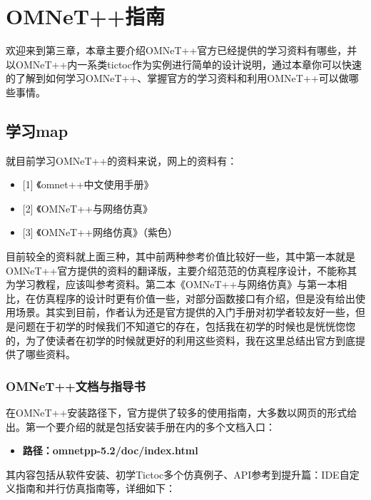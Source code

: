 \chapter{OMNeT++指南}
\label{omnet指南}

欢迎来到第三章，本章主要介绍OMNeT++官方已经提供的学习资料有哪些，并以OMNeT++内一系类tictoc作为实例进行简单的设计说明，通过本章你可以快速的了解到如何学习OMNeT++、掌握官方的学习资料和利用OMNeT++可以做哪些事情。

\section{学习map}
\label{学习map}

就目前学习OMNeT++的资料来说，网上的资料有：

\begin{itemize}
\item {[1]} 《omnet++中文使用手册》

\item {[2]} 《OMNeT++与网络仿真》

\item {[3]} 《OMNeT++网络仿真》（紫色） 

\end{itemize}

目前较全的资料就上面三种，其中前两种参考价值比较好一些，其中第一本就是OMNeT++官方提供的资料的翻译版，主要介绍范范的仿真程序设计，不能称其为学习教程，应该叫参考资料。第二本《OMNeT++与网络仿真》与第一本相比，在仿真程序的设计时更有价值一些，对部分函数接口有介绍，但是没有给出使用场景。其实到目前，作者认为还是官方提供的入门手册对初学者较友好一些，但是问题在于初学的时候我们不知道它的存在，包括我在初学的时候也是恍恍惚惚的，为了使读者在初学的时候就更好的利用这些资料，我在这里总结出官方到底提供了哪些资料。

\subsection{OMNeT++文档与指导书}
\label{omnet文档与指导书}

在OMNeT++安装路径下，官方提供了较多的使用指南，大多数以网页的形式给出。第一个要介绍的就是包括安装手册在内的多个文档入口：

\begin{itemize}
\item \textbf{路径：omnetpp-5.2\slash doc\slash index.html}

\end{itemize}

其内容包括从软件安装、初学Tictoc多个仿真例子、API参考到提升篇：IDE自定义指南和并行仿真指南等，详细如下：

